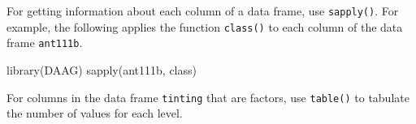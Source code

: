 \begin{enumerate}
For getting information about each column of a data frame, use
\texttt{sapply()}.  For example, the following applies the function
\texttt{class()} to each column of the data frame \texttt{ant111b}.
\begin{Schunk}
\begin{Sinput}
library(DAAG)
sapply(ant111b, class)
\end{Sinput}
\end{Schunk}
For columns in the data frame \texttt{tinting} that are factors, use
\texttt{table()} to tabulate the number of values for each level.
\end{enumerate}
%

